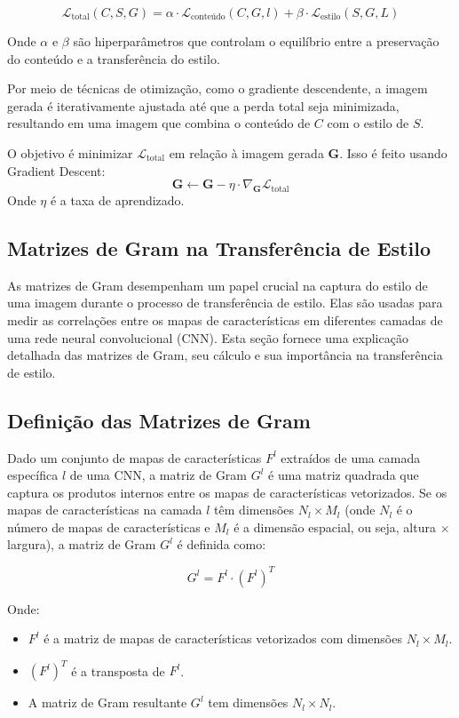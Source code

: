 \documentclass{tufte-handout}
\let\subsubsection\subsection
\begin{document}
\begin{equation}
    \mathcal{L}_{\text{total}} (C, S, G) = \alpha \cdot \mathcal{L}_{\text{conteúdo}} (C, G, l) + \beta \cdot \mathcal{L}_{\text{estilo}} (S, G, L)
\end{equation}

Onde $\alpha$ e $\beta$ são hiperparâmetros que controlam o equilíbrio entre a preservação do conteúdo e a transferência do estilo.

Por meio de técnicas de otimização, como o gradiente descendente, a imagem gerada é iterativamente ajustada até que a perda total seja minimizada, resultando em uma imagem que combina o conteúdo de $C$ com o estilo de $S$.


O objetivo é minimizar \( \mathcal{L}_{\text{total}} \) em relação à imagem gerada \( \mathbf{G} \). Isso é feito usando Gradient Descent:
\[
\mathbf{G} \leftarrow \mathbf{G} - \eta \cdot \nabla_{\mathbf{G}} \mathcal{L}_{\text{total}}
\]
Onde \( \eta \) é a taxa de aprendizado.

\subsection{Matrizes de Gram na Transferência de Estilo}

As matrizes de Gram desempenham um papel crucial na captura do estilo de uma imagem durante o processo de transferência de estilo. Elas são usadas para medir as correlações entre os mapas de características em diferentes camadas de uma rede neural convolucional (CNN). Esta seção fornece uma explicação detalhada das matrizes de Gram, seu cálculo e sua importância na transferência de estilo.

\subsubsection{Definição das Matrizes de Gram}

Dado um conjunto de mapas de características $F^l$ extraídos de uma camada específica $l$ de uma CNN, a matriz de Gram $G^l$ é uma matriz quadrada que captura os produtos internos entre os mapas de características vetorizados. Se os mapas de características na camada $l$ têm dimensões $N_l \times M_l$ (onde $N_l$ é o número de mapas de características e $M_l$ é a dimensão espacial, ou seja, altura $\times$ largura), a matriz de Gram $G^l$ é definida como:

\[
G^l = F^l \cdot (F^l)^T
\]

Onde:
\begin{itemize}
    \item $F^l$ é a matriz de mapas de características vetorizados com dimensões $N_l \times M_l$.
    \item $(F^l)^T$ é a transposta de $F^l$.
    \item A matriz de Gram resultante $G^l$ tem dimensões $N_l \times N_l$.
\end{itemize}
\end{document}
